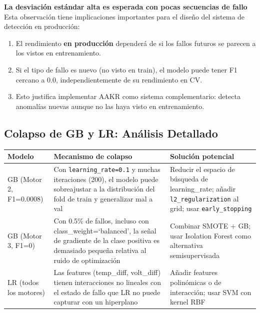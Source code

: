 \documentclass[12pt,a4paper]{article}
\begin{document}
\begin{advertenciabox}
\textbf{La desviaci\'{o}n est\'{a}ndar alta es \textbf{esperada} con pocas secuencias de fallo}\\[4pt]
Esta observaci\'{o}n tiene implicaciones importantes para el dise\~{n}o del sistema de
detecci\'{o}n en producci\'{o}n:
\begin{enumerate}[itemsep=2pt]
  \item El rendimiento \textbf{en producci\'{o}n} depender\'{a} de si los fallos futuros
    se parecen a los vistos en entrenamiento.
  \item Si el tipo de fallo es nuevo (no visto en train), el modelo puede tener
    F1 cercano a 0.0, independientemente de su rendimiento en CV.
  \item Esto justifica implementar AAKR como sistema complementario: detecta
    anomal\'{i}as nuevas aunque no las haya visto en entrenamiento.
\end{enumerate}
\end{advertenciabox}

\subsection{Colapso de GB y LR: An\'{a}lisis Detallado}

\begin{center}
\begin{tabular}{p{3cm}p{4cm}p{4.5cm}}
\toprule
\textbf{Modelo} & \textbf{Mecanismo de colapso} & \textbf{Soluci\'{o}n potencial} \\
\midrule
GB (Motor 2, F1=0.0008) &
  Con \texttt{learning\_rate=0.1} y muchas iteraciones (200), el modelo puede
  sobreajustar a la distribuci\'{o}n del fold de train y generalizar mal a val &
  Reducir el espacio de b\'{u}squeda de learning\_rate; añadir \texttt{l2\_regularization}
  al grid; usar \texttt{early\_stopping} \\
\addlinespace
GB (Motor 3, F1=0) &
  Con 0.5\% de fallos, incluso con class\_weight=`balanced', la señal de gradiente
  de la clase positiva es demasiado peque\~{n}a relativa al ruido de optimizaci\'{o}n &
  Combinar SMOTE + GB; usar Isolation Forest como alternativa semisupervisada \\
\addlinespace
LR (todos los motores) &
  Las features (temp\_diff, volt\_diff) tienen interacciones no lineales con el
  estado de fallo que LR no puede capturar con un hiperplano &
  Añadir features polin\'{o}micas o de interacci\'{o}n; usar SVM con kernel RBF \\
\bottomrule
\end{tabular}
\end{center}
\end{document}
